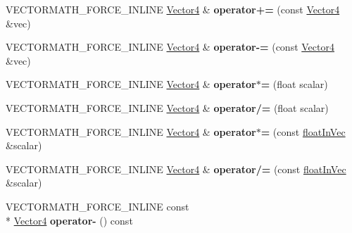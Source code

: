 \begin{DoxyCompactItemize}
\item 
\hypertarget{class_vectormath_1_1_aos_1_1_vector4_ae24d5950c0c5eb7f00d07b8cb6f652c5}{V\+E\+C\+T\+O\+R\+M\+A\+T\+H\+\_\+\+F\+O\+R\+C\+E\+\_\+\+I\+N\+L\+I\+N\+E \hyperlink{class_vectormath_1_1_aos_1_1_vector4}{Vector4} \& {\bfseries operator+=} (const \hyperlink{class_vectormath_1_1_aos_1_1_vector4}{Vector4} \&vec)}\label{class_vectormath_1_1_aos_1_1_vector4_ae24d5950c0c5eb7f00d07b8cb6f652c5}

\item 
\hypertarget{class_vectormath_1_1_aos_1_1_vector4_ab9a663764d89cf57d19fbf93034c1282}{V\+E\+C\+T\+O\+R\+M\+A\+T\+H\+\_\+\+F\+O\+R\+C\+E\+\_\+\+I\+N\+L\+I\+N\+E \hyperlink{class_vectormath_1_1_aos_1_1_vector4}{Vector4} \& {\bfseries operator-\/=} (const \hyperlink{class_vectormath_1_1_aos_1_1_vector4}{Vector4} \&vec)}\label{class_vectormath_1_1_aos_1_1_vector4_ab9a663764d89cf57d19fbf93034c1282}

\item 
\hypertarget{class_vectormath_1_1_aos_1_1_vector4_ae10f2e976fe6ff7df2e1f233ecdc5149}{V\+E\+C\+T\+O\+R\+M\+A\+T\+H\+\_\+\+F\+O\+R\+C\+E\+\_\+\+I\+N\+L\+I\+N\+E \hyperlink{class_vectormath_1_1_aos_1_1_vector4}{Vector4} \& {\bfseries operator$\ast$=} (float scalar)}\label{class_vectormath_1_1_aos_1_1_vector4_ae10f2e976fe6ff7df2e1f233ecdc5149}

\item 
\hypertarget{class_vectormath_1_1_aos_1_1_vector4_a2510ee14cac26209bccebe162c975cc9}{V\+E\+C\+T\+O\+R\+M\+A\+T\+H\+\_\+\+F\+O\+R\+C\+E\+\_\+\+I\+N\+L\+I\+N\+E \hyperlink{class_vectormath_1_1_aos_1_1_vector4}{Vector4} \& {\bfseries operator/=} (float scalar)}\label{class_vectormath_1_1_aos_1_1_vector4_a2510ee14cac26209bccebe162c975cc9}

\item 
\hypertarget{class_vectormath_1_1_aos_1_1_vector4_a8652ccba522d8d33ade7af7ddd6ae7c7}{V\+E\+C\+T\+O\+R\+M\+A\+T\+H\+\_\+\+F\+O\+R\+C\+E\+\_\+\+I\+N\+L\+I\+N\+E \hyperlink{class_vectormath_1_1_aos_1_1_vector4}{Vector4} \& {\bfseries operator$\ast$=} (const \hyperlink{class_vectormath_1_1float_in_vec}{float\+In\+Vec} \&scalar)}\label{class_vectormath_1_1_aos_1_1_vector4_a8652ccba522d8d33ade7af7ddd6ae7c7}

\item 
\hypertarget{class_vectormath_1_1_aos_1_1_vector4_a79dfe968929d129bc9175b9fec4ab707}{V\+E\+C\+T\+O\+R\+M\+A\+T\+H\+\_\+\+F\+O\+R\+C\+E\+\_\+\+I\+N\+L\+I\+N\+E \hyperlink{class_vectormath_1_1_aos_1_1_vector4}{Vector4} \& {\bfseries operator/=} (const \hyperlink{class_vectormath_1_1float_in_vec}{float\+In\+Vec} \&scalar)}\label{class_vectormath_1_1_aos_1_1_vector4_a79dfe968929d129bc9175b9fec4ab707}

\item 
\hypertarget{class_vectormath_1_1_aos_1_1_vector4_acb2caf00f4d64495d57957b367d42c1f}{V\+E\+C\+T\+O\+R\+M\+A\+T\+H\+\_\+\+F\+O\+R\+C\+E\+\_\+\+I\+N\+L\+I\+N\+E const \\*
\hyperlink{class_vectormath_1_1_aos_1_1_vector4}{Vector4} {\bfseries operator-\/} () const }\label{class_vectormath_1_1_aos_1_1_vector4_acb2caf00f4d64495d57957b367d42c1f}

\end{DoxyCompactItemize}
